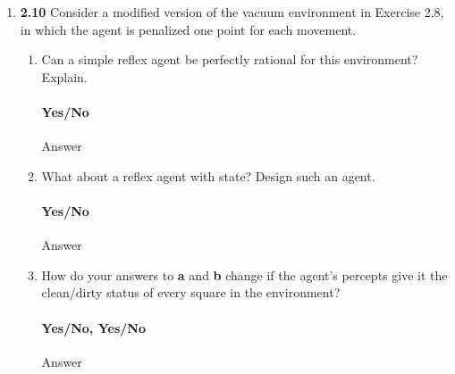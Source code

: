 \documentclass[12pt]{article}
\begin{document}
\begin{enumerate}
\item \textbf{2.10} Consider a modified version of the vacuum environment in Exercise 2.8, in which the
agent is penalized one point for each movement.
  \begin{enumerate}
  \item Can a simple reflex agent be perfectly rational for this environment? Explain.\\
  \vspace{-2.5em}
  \paragraph{Yes/No} Answer

  \item What about a reflex agent with state? Design such an agent.\\
  \vspace{-2.5em}
  \paragraph{Yes/No} Answer

  \item How do your answers to \textbf{a} and \textbf{b} change if the agent’s percepts give it the clean/dirty
  status of every square in the environment?\\
  \vspace{-2.5em}
  \paragraph{Yes/No, Yes/No} Answer
  \end{enumerate}

\end{enumerate}
\end{document}
